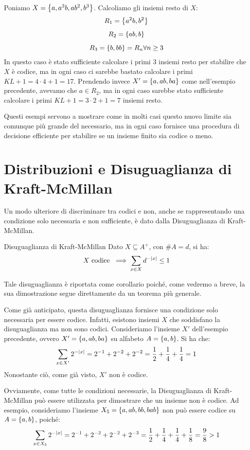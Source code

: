 \begin{example}{}
  Poniamo \(X = \set{a,a^3b,ab^2,b^3}\). Calcoliamo gli insiemi resto di \(X\):
  \[R_1 = \set{a^2b,b^2}\]
  \[R_2 = \set{ab,b}\]
  \[R_3 = \set{b,bb} = R_n \forall n \geq 3\]
  In questo caso è stato sufficiente calcolare i primi \(3\) insiemi resto per stabilire che \(X\) è codice, ma in ogni caso ci sarebbe bastato calcolare i primi \(KL+1 = 4\cdot 4 + 1 = 17\).
  Prendendo invece \(X' = \set{a,ab,ba}\) come nell'esempio precedente, avevamo che \(a \in R_2\), ma in ogni caso sarebbe stato sufficiente calcolare i primi \(KL+1 = 3\cdot 2 + 1 = 7\) insiemi resto.
\end{example}

Questi esempi servono a mostrare come in molti casi questo nuovo limite sia comunque più grande del necessario, ma in ogni caso fornisce una procedura di decisione efficiente per stabilire se un insieme finito sia codice o meno.

\section{Distribuzioni e Disuguaglianza di Kraft-McMillan}

Un modo ulteriore di discriminare tra codici e non, anche se rappresentando una condizione solo necessaria e non sufficiente, è dato dalla Disuguaglianza di Kraft-McMillan.
\begin{corollary}[namedlabel={cor:kraft-mcmillan_inequality}{Disuguaglianza di Kraft-McMillan}]{Disuguaglianza di Kraft-McMillan}
  Dato \(X \subseteq A^+\), con \(\# A = d\), si ha:
    \[X \text{ codice } \implies \sum_{x \in X} d^{-\left|x\right|} \leq 1\]
\end{corollary}

Tale disuguaglianza è riportata come corollario poiché, come vedremo a breve, la sua dimostrazione segue direttamente da un teorema più generale.

\begin{example}[label=ex:kraft-mcmillan]{}
  Come già anticipato, questa disuguaglianza fornisce una condizione solo necessaria per essere codice. Infatti, esistono insiemi \(X\) che soddisfano la disuguaglianza ma non sono codici.
  Consideriamo l'insieme \(X'\) dell'esempio precedente, ovvero \(X' = \set{a,ab,ba}\) su alfabeto \(A = \set{a,b}\).
  Si ha che:
  \[\sum_{x \in X'} 2^{-\left|x\right|}= 2^{-1} + 2^{-2} + 2^{-2} = \frac{1}{2} + \frac{1}{4} + \frac{1}{4} = 1\]
  Nonostante ciò, come già visto, \(X'\) non è codice.
  
  Ovviamente, come tutte le condizioni necessarie, la Disuguaglianza di Kraft-McMillan può essere utilizzata per dimostrare che un insieme non è codice.
  Ad esempio, consideriamo l'insieme \(X_5 = \set{a,ab,bb,bab}\) non può essere codice su \(A = \set{a,b}\), poiché:
  \[\sum_{x \in X_5} 2^{-\left|x\right|}= 2^{-1} + 2^{-2} + 2^{-2} + 2^{-3} = \frac{1}{2} + \frac{1}{4} + \frac{1}{4} + \frac{1}{8} = \frac{9}{8} > 1\]
\end{example}

